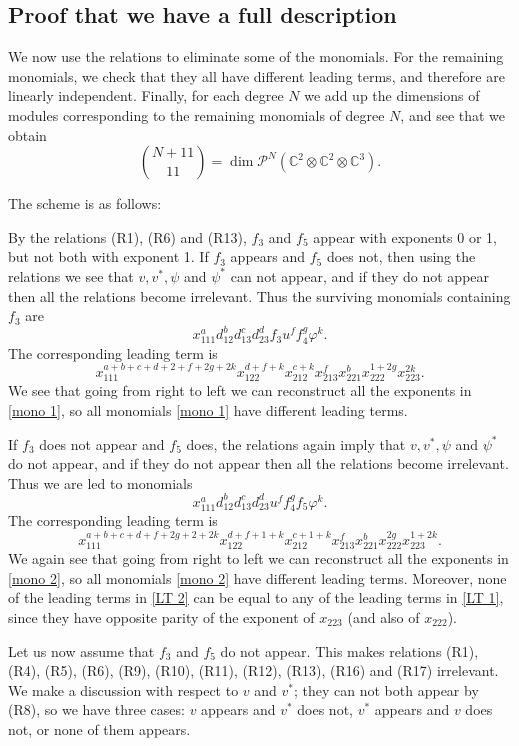 \documentclass[reqno,11pt]{amsart}
\theoremstyle{remark}
\theoremstyle{definition}
\numberwithin{equation}{section}
\newcommand{\cal}{\mathcal}
\newcommand{\eq}{\begin{equation}}
\newcommand{\eeq}{\end{equation}}
\newcommand{\bbC}{\mathbb{C}}
\begin{document}

\subsection{Proof that we have a full description}

We now use the relations to eliminate some of the monomials. For the remaining monomials, we check that they all have different leading terms, and therefore are linearly independent. Finally, for each degree $N$ we add up the dimensions of modules corresponding to the remaining monomials of degree $N$, and  see that we obtain 
\[
\binom{N+11}{11}=\dim\cal P^N(\bbC^2\otimes\bbC^2\otimes\bbC^3).
\]


The scheme is as follows:

By the relations (R1), (R6) and (R13), $f_3$ and $f_5$ appear with exponents 0 or 1, but not both with exponent 1. If $f_3$ appears and $f_5$ does not, then using the relations we see that $v,v^*,\psi$ and $\psi^*$ can not appear, and if they do not appear then all the relations become irrelevant. Thus the surviving monomials containing $f_3$ are
\eq
\label{mono 1}
x_{111}^ad_{12}^bd_{13}^cd_{23}^df_3u^ff_4^g\varphi^k.
\eeq
The corresponding leading term is
\eq\label{LT 1}
x_{111}^{a+b+c+d+2+f+2g+2k}x_{122}^{d+f+k}x_{212}^{c+k}x_{213}^{f}x_{221}^bx_{222}^{1+2g}x_{223}^{2k}.
\eeq
We see that going from right to left we can reconstruct all the exponents in \eqref{mono 1}, so all monomials \eqref{mono 1} have different leading terms.

If $f_3$ does not appear and $f_5$ does, the relations again imply that
$v,v^*,\psi$ and $\psi^*$ do not appear, and if they do not appear then all the relations become irrelevant. Thus we are led to monomials
\eq\label{mono 2}
x_{111}^ad_{12}^bd_{13}^cd_{23}^du^ff_4^gf_5\varphi^k.
\eeq
The corresponding leading term is
\eq\label{LT 2}
x_{111}^{a+b+c+d+f+2g+2+2k}x_{122}^{d+f+1+k}x_{212}^{c+1+k}x_{213}^{f}x_{221}^bx_{222}^{2g}x_{223}^{1+2k}.
\eeq
We again see that going from right to left we can reconstruct all the exponents in \eqref{mono 2}, so all monomials \eqref{mono 2} have different leading terms. Moreover, none of the leading terms in \eqref{LT 2} can be equal to any of the leading terms in \eqref{LT 1}, since they have opposite parity of the exponent of $x_{223}$ (and also of $x_{222}$).


Let us now assume that $f_3$ and $f_5$ do not appear. This makes relations (R1), (R4), (R5), (R6), (R9), (R10), (R11), (R12), (R13), (R16) and (R17) irrelevant. 
We make a discussion with respect to $v$ and $v^*$; they can not both appear by (R8), so we have three cases: $v$ appears and $v^*$ does not, $v^*$ appears and $v$ does not, or none of them appears. 
\end{document}
